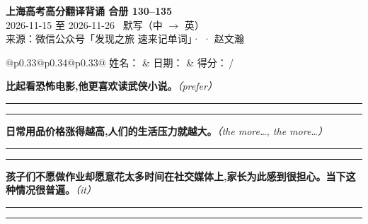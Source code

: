 \documentclass[11pt,a4paper]{article}
\newcommand{\num}[1]{\makebox[1.9em][r]{#1.}\hspace{0.3em}}
\newcommand{\wline}{\noindent\rule{\linewidth}{0.4pt}}
\newcommand{\prompt}[1]{\emph{\textcolor{tipblue}{\small（#1）}}}
\begin{document}
\pagestyle{plain}
\begin{center}
{\LARGE\bfseries 上海高考高分翻译背诵 \quad 合册 130–135}\\[0.25em]
{\large 2026-11-15 至 2026-11-26 \quad\ 默写（中 $\to$ 英）}\\[0.35em]
{\footnotesize 来源：微信公众号「发现之旅 速来记单词」·  · 赵文瀚}
\end{center}

\vspace{0.4em}
\noindent\begin{tabular}{@{}p{0.33\textwidth}@{}p{0.34\textwidth}@{}p{0.33\textwidth}@{}}
姓名：\underline{\hspace{2.0cm}} & 日期：\underline{\hspace{2.0cm}} & 得分：\underline{\hspace{1.4cm}}\,/ \\
\end{tabular}

\vspace{0.5em}

\vspace{0.8em}
\vspace{0.35em}\vspace{0.15em}

\begin{minipage}{\linewidth}

\num{1}\textbf{比起看恐怖电影,他更喜欢读武侠小说。}\prompt{prefer}

\vspace{0.3em}

\wline\vspace{0.3em}
\wline

\end{minipage}

\begin{minipage}{\linewidth}

\num{2}\textbf{日常用品价格涨得越高,人们的生活压力就越大。}\prompt{the more…, the more…}

\vspace{0.3em}

\wline\vspace{0.3em}
\wline

\end{minipage}

\begin{minipage}{\linewidth}

\num{3}\textbf{孩子们不愿做作业却愿意花太多时间在社交媒体上,家长为此感到很担心。当下这种情况很普遍。}\prompt{it}

\vspace{0.3em}

\wline\vspace{0.3em}
\wline

\end{minipage}
\end{document}

